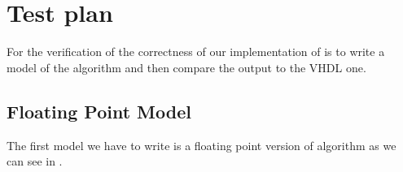 \chapter{Test plan}\label{ch:test}
For the verification of the correctness of our implementation of
\cordic{} is to write a \matlab{} model of the algorithm and then compare the
output to the VHDL one.

\section{Floating Point Model}\label{sec:floating_point_model}
The first model we have to write is a floating point version of \cordic{}
algorithm as we can see in .





%
